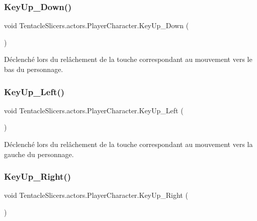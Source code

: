 \subsubsection{\texorpdfstring{Key\+Up\+\_\+\+Down()}{KeyUp\_Down()}}
{\footnotesize\ttfamily void Tentacle\+Slicers.\+actors.\+Player\+Character.\+Key\+Up\+\_\+\+Down (\begin{DoxyParamCaption}{ }\end{DoxyParamCaption})}



Déclenché lors du relâchement de la touche correspondant au mouvement vers le bas du personnage. 

\mbox{\label{class_tentacle_slicers_1_1actors_1_1_player_character_a84e49238e717a5758a16482b728f7863}} 
\subsubsection{\texorpdfstring{Key\+Up\+\_\+\+Left()}{KeyUp\_Left()}}
{\footnotesize\ttfamily void Tentacle\+Slicers.\+actors.\+Player\+Character.\+Key\+Up\+\_\+\+Left (\begin{DoxyParamCaption}{ }\end{DoxyParamCaption})}



Déclenché lors du relâchement de la touche correspondant au mouvement vers la gauche du personnage. 

\mbox{\label{class_tentacle_slicers_1_1actors_1_1_player_character_a8423a25a3ff0fcd6e9f883c4375fe627}} 
\subsubsection{\texorpdfstring{Key\+Up\+\_\+\+Right()}{KeyUp\_Right()}}
{\footnotesize\ttfamily void Tentacle\+Slicers.\+actors.\+Player\+Character.\+Key\+Up\+\_\+\+Right (\begin{DoxyParamCaption}{ }\end{DoxyParamCaption})}



